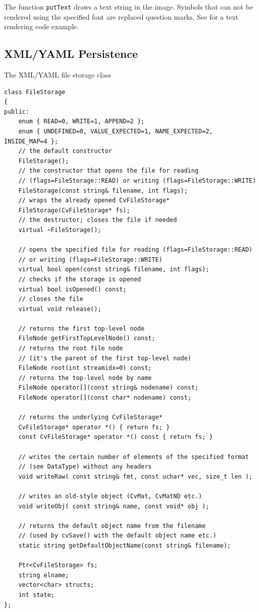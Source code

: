 The function \texttt{putText} draws a text string in the image.
Symbols that can not be rendered using the specified font are
replaced question marks. See  for a text rendering code example.

\subsection{XML/YAML Persistence}

\label{FileStorage}
The XML/YAML file storage class

\begin{lstlisting}
class FileStorage
{
public:
    enum { READ=0, WRITE=1, APPEND=2 };
    enum { UNDEFINED=0, VALUE_EXPECTED=1, NAME_EXPECTED=2, INSIDE_MAP=4 };
    // the default constructor
    FileStorage();
    // the constructor that opens the file for reading
    // (flags=FileStorage::READ) or writing (flags=FileStorage::WRITE)
    FileStorage(const string& filename, int flags);
    // wraps the already opened CvFileStorage*
    FileStorage(CvFileStorage* fs);
    // the destructor; closes the file if needed
    virtual ~FileStorage();

    // opens the specified file for reading (flags=FileStorage::READ)
    // or writing (flags=FileStorage::WRITE)
    virtual bool open(const string& filename, int flags);
    // checks if the storage is opened
    virtual bool isOpened() const;
    // closes the file
    virtual void release();

    // returns the first top-level node
    FileNode getFirstTopLevelNode() const;
    // returns the root file node
    // (it's the parent of the first top-level node)
    FileNode root(int streamidx=0) const;
    // returns the top-level node by name
    FileNode operator[](const string& nodename) const;
    FileNode operator[](const char* nodename) const;

    // returns the underlying CvFileStorage*
    CvFileStorage* operator *() { return fs; }
    const CvFileStorage* operator *() const { return fs; }
    
    // writes the certain number of elements of the specified format
    // (see DataType) without any headers
    void writeRaw( const string& fmt, const uchar* vec, size_t len );
    
    // writes an old-style object (CvMat, CvMatND etc.)
    void writeObj( const string& name, const void* obj );

    // returns the default object name from the filename
    // (used by cvSave() with the default object name etc.)
    static string getDefaultObjectName(const string& filename);

    Ptr<CvFileStorage> fs;
    string elname;
    vector<char> structs;
    int state;
};
\end{lstlisting}


